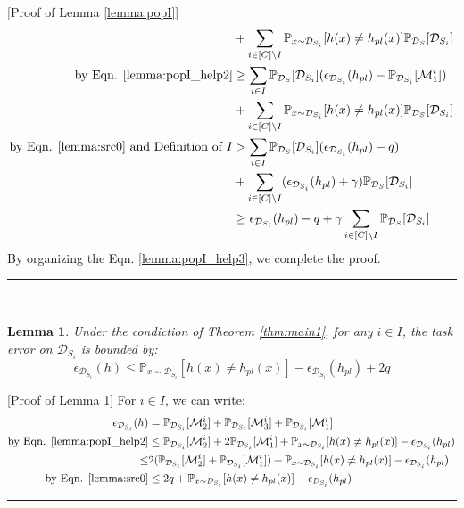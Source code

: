 \documentclass{article}
\newcommand{\BlackBox}{\rule{1.5ex}{1.5ex}}  \fi
\newenvironment{proof}{\par\noindent{\em Proof:\ }}{\hfill\BlackBox\\[.0mm]}
\newtheorem{lemma}{Lemma}[section]
\begin{document}
\begin{proof}[Proof of Lemma \ref{lemma:popI}]
\begin{equation}
\begin{aligned}
        &+\sum_{i\in [C]\setminus I} \mathbb{P}_{x\sim \mathcal{D}_{S_i}}[h(x)\neq h_{pl}(x)] \mathbb{P}_{\mathcal{D}_{S}}[\mathcal{D}_{S_i}]\\
        \text{by Eqn. \ref{lemma:popI_help2}}&\geq 
        \sum_{i\in I} \mathbb{P}_{\mathcal{D}_{S}}[\mathcal{D}_{S_i}](\epsilon_{\mathcal{D}_{S_i}}(h_{pl})-\mathbb{P}_{\mathcal{D}_{S_i}}[\mathcal{M}_1^i])
         \\
        &+\sum_{i\in [C]\setminus I}
        \mathbb{P}_{x\sim \mathcal{D}_{S_i}}[h(x)\neq h_{pl}(x)] \mathbb{P}_{\mathcal{D}_{S}}[\mathcal{D}_{S_i}] \\
        \text{by Eqn. \ref{lemma:src0} and Definition of $I$}&> 
        \sum_{i\in I} \mathbb{P}_{\mathcal{D}_{S}}[\mathcal{D}_{S_i}](\epsilon_{\mathcal{D}_{S_i}}(h_{pl})-q)
         \\
        &+\sum_{i\in [C]\setminus I}
        (\epsilon_{\mathcal{D}_{S_i}}(h_{pl}) + \gamma) \mathbb{P}_{\mathcal{D}_{S}}[\mathcal{D}_{S_i}]\\
        &\geq \epsilon_{\mathcal{D}_{S_i}}(h_{pl}) -q + \gamma \sum_{i\in [C]\setminus I} \mathbb{P}_{\mathcal{D}_{S}}[\mathcal{D}_{S_i}]
    \end{aligned}
\end{equation}
By organizing the Eqn. \ref{lemma:popI_help3}, we complete the proof.
\end{proof}

\begin{lemma}\label{lemma:errI} Under the condiction of Theorem \ref{thm:main1}, for any $i \in  I$, the task error on $\mathcal{D}_{S_i}$ is bounded by:
$$\epsilon_{\mathcal{D}_{S_i}}(h)\leq \mathbb{P}_{x\sim\mathcal{D}_{S_i}}[h(x)\neq h_{pl}(x)]- \epsilon_{\mathcal{D}_{S_i}}(h_{pl}) + 2q$$
\end{lemma}
\begin{proof}[Proof of Lemma \ref{lemma:errI}] For $i\in I$, we can write:
\begin{equation}
    \begin{aligned}
        \epsilon_{\mathcal{D}_{S_i}}(h) &= \mathbb{P}_{\mathcal{D}_{S_i}}[\mathcal{M}^i_2]+ \mathbb{P}_{\mathcal{D}_{S_i}}[\mathcal{M}^i_3] +\mathbb{P}_{\mathcal{D}_{S_i}}[\mathcal{M}^i_1]\\
        \text{by Eqn. \ref{lemma:popI_help2}}&\leq
        \mathbb{P}_{\mathcal{D}_{S_i}}[\mathcal{M}^i_2]  +2\mathbb{P}_{\mathcal{D}_{S_i}}[\mathcal{M}^i_1] + \mathbb{P}_{x\sim\mathcal{D}_{S_i}}[h(x)\neq h_{pl}(x)]-\epsilon_{\mathcal{D}_{S_i}}(h_{pl})\\
        \leq&2(\mathbb{P}_{\mathcal{D}_{S_i}}[\mathcal{M}^i_2]  +\mathbb{P}_{\mathcal{D}_{S_i}}[\mathcal{M}^i_1]) + \mathbb{P}_{x\sim\mathcal{D}_{S_i}}[h(x)\neq h_{pl}(x)]-\epsilon_{\mathcal{D}_{S_i}}(h_{pl})\\
        \text{by Eqn. \ref{lemma:src0}}&\leq
        2q  + \mathbb{P}_{x\sim\mathcal{D}_{S_i}}[h(x)\neq h_{pl}(x)]-\epsilon_{\mathcal{D}_{S_i}}(h_{pl})
    \end{aligned}
\end{equation}
\end{proof}
\end{document}
